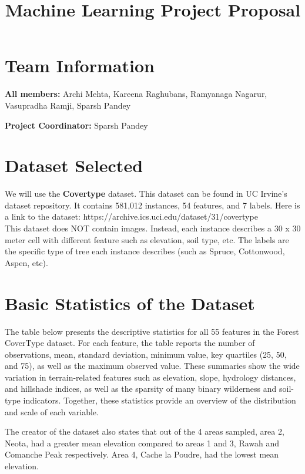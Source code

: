 \documentclass[11pt]{article}
\title{Machine Learning Project Proposal}
\date{}
\begin{document}
\maketitle

\section{Team Information}

	\hspace*{\parindent}\textbf{All members:}  Archi Mehta, Kareena Raghubans, Ramyanaga Nagarur, 
Vasupradha Ramji, Sparsh Pandey

	\textbf{Project Coordinator:} Sparsh Pandey
	

\section{Dataset Selected}

\hspace*{\parindent}We will use the  \textbf{Covertype} dataset. This dataset can be found in UC Irvine's dataset repository. It contains 581,012 instances, 54 features, and 7 labels. Here is a link to the dataset: https://archive.ics.uci.edu/dataset/31/covertype \\

This dataset does NOT contain images. Instead, each instance describes a 30 x 30 meter cell with different feature such as elevation, soil type, etc. The labels are the specific type of tree each instance describes (such as Spruce, Cottonwood, Aspen, etc). 

\section{Basic Statistics of the Dataset}

The table below presents the descriptive statistics for all 55 features in the Forest CoverType dataset. For each feature, the table reports the number of observations, mean, standard deviation, minimum value, key quartiles (25, 50, and 75), as well as the maximum observed value. These summaries show the wide variation in terrain-related features such as elevation, slope, hydrology distances, and hillshade indices, as well as the sparsity of many binary wilderness and soil-type indicators. Together, these statistics provide an overview of the distribution and scale of each variable.

The creator of the dataset also states that out of the 4 areas sampled, area 2, Neota, had a greater mean elevation compared to areas 1 and 3, Rawah and Comanche Peak respectively. Area 4, Cache la Poudre, had the lowest mean elevation.
\end{document}
